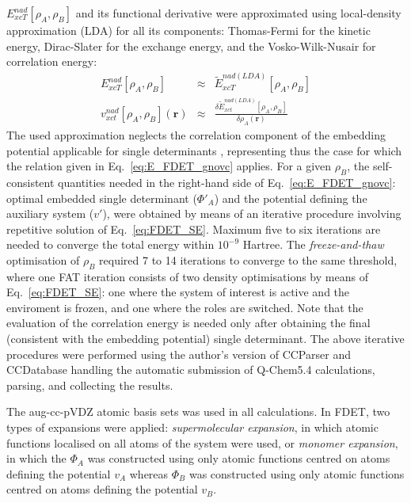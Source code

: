 \documentclass[amsmath,amssymb,preprint,aip,jcp]{revtex4-1}
\begin{document}
$E_{xcT}^{nad}[\rho_A,\rho_B]$ and its functional derivative were approximated using local-density approximation (LDA) for all its components: Thomas-Fermi \cite{Thomas1927, Fermi1928} for the kinetic energy, Dirac-Slater\cite{Slater1929} for the exchange energy, and the Vosko-Wilk-Nusair \cite{Vosko1980} for correlation energy:
\begin{eqnarray}
{E}_{xcT}^{nad}[\rho_A,\rho_B]&\approx& \tilde {E}_{xcT}^{nad(LDA)}[\rho_A,\rho_B] \\
v_{xct}^{nad}[\rho_A,\rho_B](\mathbf{r})&\approx&\frac{\delta \tilde{E}_{xct}^{nad(LDA)}[\rho_A,\rho_B]}{\delta\rho_A(\mathbf{r})}
\end{eqnarray}
The used approximation neglects the correlation component of the embedding potential applicable for single determinants \cite{Wesolowski2008}, representing thus the case for which the relation given in Eq.~\ref{eq:E_FDET_gnovc} applies. 
For a given $\rho_B$, the self-consistent quantities needed in the right-hand side of Eq.~\ref{eq:E_FDET_gnovc}: 
optimal embedded single determinant ($\Phi'_A$) and the potential defining the auxiliary system ($v'$), 
were obtained by means of an iterative procedure involving repetitive solution of Eq.~\ref{eq:FDET_SE}. 
Maximum five to six iterations are needed to converge the total energy within $10^{-9}$ Hartree. 
The \textit{freeze-and-thaw} optimisation of $\rho_B$ required 7 to 14 iterations to converge to the same threshold, where one FAT iteration consists of two density optimisations by means of Eq.~\ref{eq:FDET_SE}: one where the system of interest is active and the enviroment is frozen, and one where the roles are switched. 
Note that the evaluation of the correlation energy is needed only after obtaining the final (consistent with the embedding potential) single determinant. 
The above iterative procedures
were performed using the author's version \cite{CCParser_Ricardi} of CCParser\cite{CCParser_Zech} and CCDatabase\cite{CCDatabase} handling the automatic submission of Q-Chem5.4\cite{Qchem54} calculations, parsing, and collecting the results.

The aug-cc-pVDZ atomic basis sets was used in all calculations. 
In FDET, two types of expansions were applied: {\it supermolecular expansion}, in which atomic functions localised on all atoms of the system were used, or {\it monomer expansion}, in which the $\Phi_A$ was constructed using only 
atomic functions centred on atoms defining the potential $v_A$ whereas $\Phi_B$ was constructed using only atomic functions centred on atoms defining the potential $v_B$.
\end{document}
